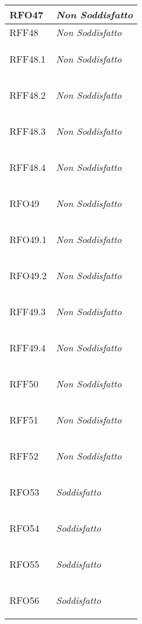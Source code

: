 \begin{longtable}{|>{\centering}m{5cm}|m{5cm}<{\centering}|}
    \hypertarget{RFO47}{RFO47} & \textit{Non Soddisfatto}\\ \hline
   
    \hypertarget{RFF48}{RFF48} & \textit{Non Soddisfatto}\\ \hline
   
    \hypertarget{RFF48.1}{RFF48.1} & \textit{Non Soddisfatto}\\ \hline
   
    \hypertarget{RFF48.2}{RFF48.2} & \textit{Non Soddisfatto}\\ \hline
   
    \hypertarget{RFF48.3}{RFF48.3} & \textit{Non Soddisfatto}\\ \hline
   
    \hypertarget{RFF48.4}{RFF48.4} & \textit{Non Soddisfatto}\\ \hline
   
    \hypertarget{RFO49}{RFO49} & \textit{Non Soddisfatto}\\ \hline
   
    \hypertarget{RFO49.1}{RFO49.1} & \textit{Non Soddisfatto}\\ \hline
   
    \hypertarget{RFO49.2}{RFO49.2} & \textit{Non Soddisfatto}\\ \hline
   
    \hypertarget{RFF49.3}{RFF49.3} & \textit{Non Soddisfatto}\\ \hline
   
    \hypertarget{RFF49.4}{RFF49.4} & \textit{Non Soddisfatto}\\ \hline
   
    \hypertarget{RFF50}{RFF50} & \textit{Non Soddisfatto}\\ \hline
   
    \hypertarget{RFF51}{RFF51} & \textit{Non Soddisfatto}\\ \hline
   
    \hypertarget{RFF52}{RFF52} & \textit{Non Soddisfatto}\\ \hline
   
    \hypertarget{RFO53}{RFO53} & \textit{Soddisfatto}\\ \hline
   
    \hypertarget{RFO54}{RFO54} & \textit{Soddisfatto}\\ \hline
   
    \hypertarget{RFO55}{RFO55} & \textit{Soddisfatto}\\ \hline
   
    \hypertarget{RFO56}{RFO56} & \textit{Soddisfatto}\\ \hline
   

\end{longtable}
